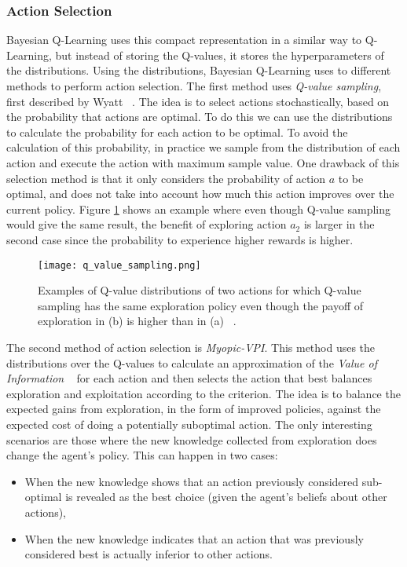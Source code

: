 \subsubsection{Action Selection}
Bayesian Q-Learning uses this compact representation in a similar way to Q-Learning, but instead of storing the Q-values, it stores the hyperparameters of the distributions. Using the distributions, Bayesian Q-Learning uses to different methods to perform action selection. The first method uses \emph{Q-value sampling}, first described by Wyatt ~\cite{articleWyatt1997}. The idea is to select actions stochastically, based on the probability that actions are optimal. To do this we can use the distributions to calculate the probability for each action to be optimal. To avoid the calculation of this probability, in practice we sample from the distribution of each action and execute the action with maximum sample value. One drawback of this selection method is that it only considers the probability of action $a$ to be optimal, and does not take into account how much this action improves over the current policy. Figure \ref{fig:q_value_sampling} shows an example where even though Q-value sampling would give the same result, the benefit of exploring action $a_2$ is larger in the second case since the probability to experience higher rewards is higher.\par
\begin{figure}
 \texttt{[image: q\_value\_sampling.png]}
 \caption{Examples of Q-value distributions of two actions for which Q-value sampling has the same exploration policy even though the payoff of exploration in (b) is higher than in (a) ~\cite{Dearden98bayesianq-learning}.}
 \label{fig:q_value_sampling}
\end{figure}
The second method of action selection is \emph{Myopic-VPI}. This method uses the distributions over the Q-values to calculate an approximation of the \emph{Value of Information} ~\cite{4082064} for each action and then selects the action that best balances exploration and exploitation according to the criterion. The idea is to balance the expected gains from exploration, in the form of improved policies, against the expected cost of doing a potentially suboptimal action. The only interesting scenarios are those where the new knowledge collected from exploration does change the agent’s policy. This can happen in two cases: 
\begin{itemize}
\item When the new knowledge shows that an action previously considered sub-optimal is revealed as the best choice (given the agent’s beliefs about other actions),
\item When the new knowledge indicates that an action that was previously considered best is actually inferior to other actions.
\end{itemize}
